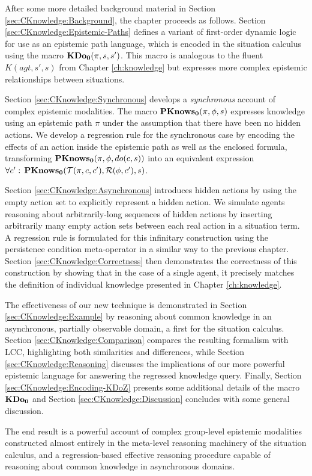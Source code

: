 After some more detailed background material in Section \ref{sec:CKnowledge:Background},
the chapter proceeds as follows. Section \ref{sec:CKnowledge:Epistemic-Paths}
defines a variant of first-order dynamic logic for use as an epistemic
path language, which is encoded in the situation calculus using the
macro $\mathbf{KDo_{0}}(\pi,s,s')$. This macro is analogous to the fluent $K(agt,s',s)$
from Chapter \ref{ch:knowledge} but expresses more complex epistemic
relationships between situations.

Section \ref{sec:CKnowledge:Synchronous} develops a \emph{synchronous}
account of complex epistemic modalities. The macro $\mathbf{PKnows_{0}}(\pi,\phi,s)$
expresses knowledge using an epistemic path $\pi$ under the assumption
that there have been no hidden actions. We develop a regression rule
for the synchronous case by encoding the effects of an action inside
the epistemic path as well as the enclosed formula, transforming $\mathbf{PKnows_{0}}(\pi,\phi,do(c,s))$
into an equivalent expression $\forall c':\,\mathbf{PKnows_{0}}(\mathcal{T}(\pi,c,c'),\mathcal{R}(\phi,c'),s)$.

Section \ref{sec:CKnowledge:Asynchronous} introduces hidden actions
by using the empty action set to explicitly represent a hidden action.
We simulate agents reasoning about arbitrarily-long sequences of hidden
actions by inserting arbitrarily many empty action sets between each
real action in a situation term. A regression rule is formulated for
this infinitary construction using the persistence condition meta-operator
in a similar way to the previous chapter. Section \ref{sec:CKnowledge:Correctness}
then demonstrates the correctness of this construction by showing
that in the case of a single agent, it precisely matches the definition
of individual knowledge presented in Chapter \ref{ch:knowledge}.

The effectiveness of our new technique is demonstrated in Section
\ref{sec:CKnowledge:Example} by reasoning about common knowledge
in an asynchronous, partially observable domain, a first for the situation
calculus. Section \ref{sec:CKnowledge:Comparison} compares the resulting
formalism with LCC, highlighting both similarities and differences,
while Section \ref{sec:CKnowledge:Reasoning} discusses the implications
of our more powerful epistemic language for answering the regressed
knowledge query. Finally, Section \ref{sec:CKnowledge:Encoding-KDoZ}
presents some additional details of the macro $\mathbf{KDo_{0}}$ and Section
\ref{sec:CKnowledge:Discussion} concludes with some general discussion.

The end result is a powerful account of complex group-level epistemic
modalities constructed almost entirely in the meta-level reasoning
machinery of the situation calculus, and a regression-based effective
reasoning procedure capable of reasoning about common knowledge in
asynchronous domains.


